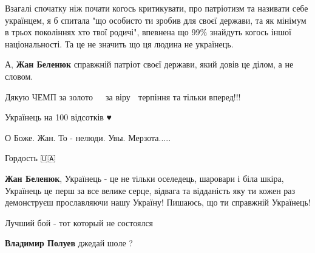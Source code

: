 \begin{itemize}
Взагалі спочатку ніж почати когось критикувати, про патріотизм та називати себе
українцем, я б спитала "що особисто ти зробив для своєї держави, та як мінімум
в трьох поколіннях хто твої родичі", впевнена що 99\% знайдуть когось іншої
національності. Та це не значить що ця людина не українець.

А, \textbf{Жан Беленюк} справжній патріот своєї держави, який довів це ділом, а не
словом.

Дякую ЧЕМП за золото 🥇🇺🇦 за віру 🙏 терпіння та тільки вперед!!!


Українець на 100 відсотків ♥️


О Боже. Жан. То - нелюди. Увы. Мерзота.....


Гордость 🇺🇦💪🏻


\textbf{Жан Беленюк}, Українець - це не тільки оселедець, шаровари і біла
шкіра, Українець це перш за все велике серце, відвага та відданість яку ти
кожен раз демонструєш прославляючи нашу Україну! Пишаюсь, що ти справжній
Українець!


Лучший бой - тот который не состоялся

\begin{itemize}
 
\textbf{Владимир Полуев} джедай шоле ?

 

\end{itemize}
\end{itemize}
